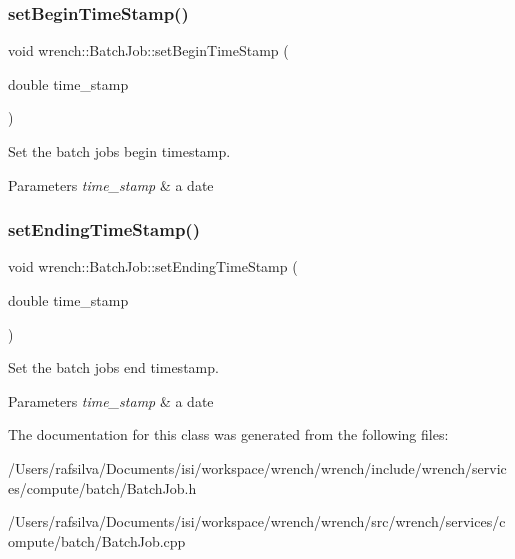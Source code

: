 \subsubsection{\texorpdfstring{set\+Begin\+Time\+Stamp()}{setBeginTimeStamp()}}
{\footnotesize\ttfamily void wrench\+::\+Batch\+Job\+::set\+Begin\+Time\+Stamp (\begin{DoxyParamCaption}\item[{double}]{time\+\_\+stamp }\end{DoxyParamCaption})}



Set the batch job\textquotesingle{}s begin timestamp. 


\begin{DoxyParams}{Parameters}
{\em time\+\_\+stamp} & a date \\
\hline
\end{DoxyParams}
\mbox{\label{classwrench_1_1_batch_job_a66ad3c01839582a91cdd636f989d2c80}} 
\subsubsection{\texorpdfstring{set\+Ending\+Time\+Stamp()}{setEndingTimeStamp()}}
{\footnotesize\ttfamily void wrench\+::\+Batch\+Job\+::set\+Ending\+Time\+Stamp (\begin{DoxyParamCaption}\item[{double}]{time\+\_\+stamp }\end{DoxyParamCaption})}



Set the batch job\textquotesingle{}s end timestamp. 


\begin{DoxyParams}{Parameters}
{\em time\+\_\+stamp} & a date \\
\hline
\end{DoxyParams}


The documentation for this class was generated from the following files\+:\begin{DoxyCompactItemize}
\item 
/\+Users/rafsilva/\+Documents/isi/workspace/wrench/wrench/include/wrench/services/compute/batch/Batch\+Job.\+h\item 
/\+Users/rafsilva/\+Documents/isi/workspace/wrench/wrench/src/wrench/services/compute/batch/Batch\+Job.\+cpp\end{DoxyCompactItemize}
